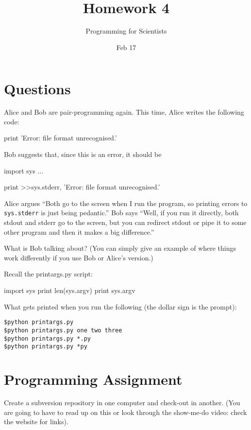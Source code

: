 
\author{Programming for Scientists}
\title{Homework 4}
\date{Feb 17}

\maketitle

\chapter{Questions}

\question %
Alice and Bob are pair-programming again. This time, Alice writes the following code:

\begin{python}
print 'Error: file format unrecognised.'
\end{python}

Bob suggests that, since this is an error, it should be 

\begin{python}
import sys
...

print >>sys.stderr, 'Error: file format unrecognised.'
\end{python}

Alice argues ``Both go to the screen when I run the program, so printing errors to \lstinline{sys.stderr} is just being pedantic.'' Bob says ``Well, if you run it directly, both stdout and stderr go to the screen, but you can redirect stdout or pipe it to some other program and then it makes a big difference.''

What is Bob talking about? (You can simply give an example of where things work differently if you use Bob or Alice's version.)

\question %
Recall the printargs.py script:

\begin{python}
import sys
print len(sys.argv)
print sys.argv
\end{python}

What gets printed when you run the following (the dollar sign is the prompt):

\begin{verbatim}
$python printargs.py
$python printargs.py one two three
$python printargs.py *.py
$python printargs.py *py
\end{verbatim}

\chapter{Programming Assignment}
Create a subversion repository in one computer and check-out in another. (You are going to have to read up on this or look through the show-me-do video: check the website for links).

